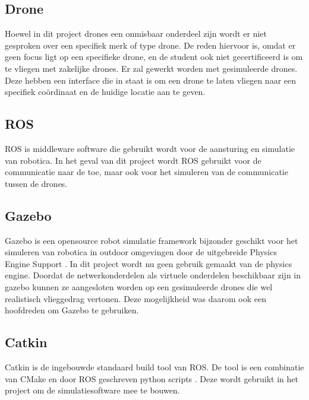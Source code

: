 \documentclass[a4paper, 11pt, oneside]{report}
\begin{document}
\subsection{Drone}
\label{inleiding:werkomgeving:drone}
Hoewel in dit project drones een onmisbaar onderdeel zijn wordt er niet gesproken over een specifiek merk of type drone.
De reden hiervoor is, omdat er geen focus ligt op een specifieke drone, en de student ook niet gecertificeerd is om te vliegen met zakelijke drones.
Er zal gewerkt worden met gesimuleerde drones. 
Deze hebben een interface die in staat is om een drone te laten vliegen naar een specifiek coördinaat en de huidige locatie aan te geven.

\subsection{ROS}
\label{inleiding:werkomgeving:ros}
ROS is middleware software die gebruikt wordt voor de aansturing en simulatie van robotica. 
In het geval van dit project wordt ROS gebruikt voor de communicatie naar de  toe, maar ook voor het simuleren van de  communicatie tussen de drones. 

\subsection{Gazebo}
\label{inleiding:werkomgeving:gazebo}

Gazebo is een opensource robot simulatie framework bijzonder geschikt voor het simuleren van robotica in outdoor omgevingen door de uitgebreide Physics Engine Support \cite{gazebo}.
In dit project wordt nu geen gebruik gemaakt van de physics engine. Doordat de netwerkonderdelen als virtuele onderdelen beschikbaar zijn in gazebo kunnen ze aangesloten worden op een gesimuleerde drones die wel realistisch vlieggedrag vertonen.
Deze mogelijkheid was daarom ook een hoofdreden om Gazebo te gebruiken.

\subsection{Catkin}
\label{inleiding:werkomgeving:catkin}

Catkin is de ingebouwde standaard build tool van ROS. De tool is een combinatie van CMake en door ROS geschreven python scripts \cite{catkin}. Deze wordt gebruikt in het project om de simulatiesoftware mee te bouwen. 
\end{document}
